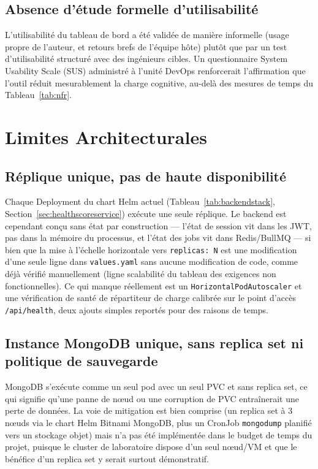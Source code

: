 \documentclass[12pt,a4paper,oneside]{report}
\begin{document}
\subsection{Absence d'étude formelle d'utilisabilité}
L'utilisabilité du tableau de bord a été validée de manière informelle (usage propre de l'auteur, et retours brefs de l'équipe hôte) plutôt que par un test d'utilisabilité structuré avec des ingénieurs cibles. Un questionnaire System Usability Scale (SUS) administré à l'unité DevOps renforcerait l'affirmation que l'outil réduit mesurablement la charge cognitive, au-delà des mesures de temps du Tableau~\ref{tab:nfr}.

\section{Limites Architecturales}
\subsection{Réplique unique, pas de haute disponibilité}
Chaque Deployment du chart Helm actuel (Tableau~\ref{tab:backendstack}, Section~\ref{sec:healthscoreservice}) exécute une seule réplique. Le backend est cependant conçu sans état par construction --- l'état de session vit dans les JWT, pas dans la mémoire du processus, et l'état des jobs vit dans Redis/BullMQ --- si bien que la mise à l'échelle horizontale vers \texttt{replicas: N} est une modification d'une seule ligne dans \texttt{values.yaml} sans aucune modification de code, comme déjà vérifié manuellement (ligne scalabilité du tableau des exigences non fonctionnelles). Ce qui manque réellement est un \texttt{HorizontalPodAutoscaler} et une vérification de santé de répartiteur de charge calibrée sur le point d'accès \texttt{/api/health}, deux ajouts simples reportés pour des raisons de temps.

\subsection{Instance MongoDB unique, sans replica set ni politique de sauvegarde}
MongoDB s'exécute comme un seul pod avec un seul PVC et sans replica set, ce qui signifie qu'une panne de nœud ou une corruption de PVC entraînerait une perte de données. La voie de mitigation est bien comprise (un replica set à 3 nœuds via le chart Helm Bitnami MongoDB, plus un CronJob \texttt{mongodump} planifié vers un stockage objet) mais n'a pas été implémentée dans le budget de temps du projet, puisque le cluster de laboratoire dispose d'un seul nœud/VM et que le bénéfice d'un replica set y serait surtout démonstratif.
\end{document}
